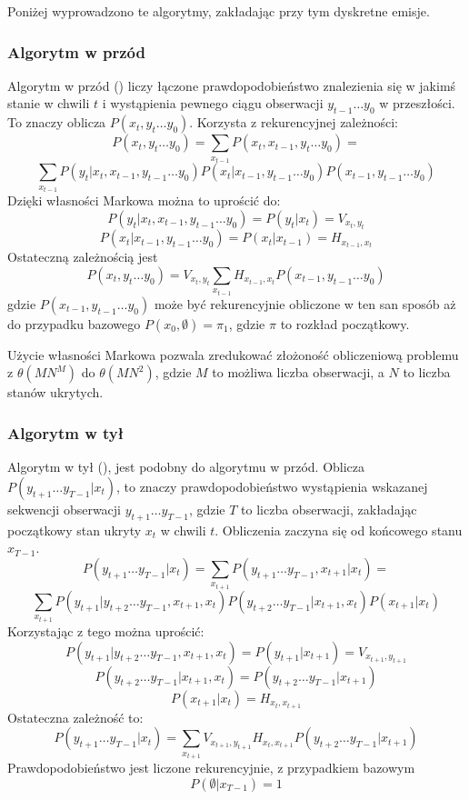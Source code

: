 Poniżej wyprowadzono te algorytmy, zakładając przy tym dyskretne emisje.

\subsubsection{Algorytm w przód}

Algorytm w przód () liczy łączone prawdopodobieństwo znalezienia się w jakimś stanie w chwili $t$
i wystąpienia pewnego ciągu obserwacji $y_{t-1} \dots y_0$ w przeszłości. To znaczy oblicza $P(x_t, y_t \dots y_0)$. Korzysta z rekurencyjnej zależności:
$$P(x_t, y_t \dots y_0) = \sum_{x_{t-1}} P(x_t, x_{t-1}, y_t \dots y_0) =$$
$$\sum_{x_{t-1}} P(y_t | x_t, x_{t-1}, y_{t-1} \dots y_0) P(x_t | x_{t-1}, y_{t-1} \dots y_0) P(x_{t-1}, y_{t-1} \dots y_0)$$
Dzięki własności Markowa można to uprościć do:
$$P(y_t | x_t, x_{t-1}, y_{t-1} \dots y_0) = P(y_t | x_t) = V_{x_t, y_t}$$
$$P(x_t | x_{t-1}, y_{t-1} \dots y_0) = P(x_t | x_{t-1}) = H_{x_{t-1}, x_t}$$
Ostateczną zależnością jest
$$P(x_t, y_t \dots y_0) = V_{x_t, y_t} \sum_{x_{t-1}} H_{x_{t-1}, x_t} P(x_{t-1}, y_{t-1} \dots y_0)$$
gdzie $P(x_{t-1}, y_{t-1} \dots y_0)$ może być rekurencyjnie obliczone w ten san sposób aż do przypadku bazowego $P(x_0, \emptyset) = \pi_1$, gdzie $\pi$ to rozkład początkowy.

Użycie własności Markowa pozwala zredukować złożoność obliczeniową problemu z $\theta(MN^M)$ do $\theta(MN^2)$, gdzie $M$ to możliwa liczba obserwacji, a $N$ to liczba stanów ukrytych.

\subsubsection{Algorytm w tył}

Algorytm w tył (), jest podobny do algorytmu w przód. Oblicza $P(y_{t+1} \dots y_{T-1} | x_t)$, to znaczy prawdopodobieństwo wystąpienia wskazanej sekwencji obserwacji $y_{t+1} \dots y_{T-1}$, gdzie $T$ to liczba obserwacji, zakładając początkowy stan ukryty $x_t$ w chwili $t$. Obliczenia zaczyna się od końcowego stanu $x_{T-1}$.
$$P(y_{t+1} \dots y_{T-1} | x_t) = \sum_{x_{t+1}} P(y_{t+1} \dots y_{T-1}, x_{t+1} | x_t) =$$
$$\sum_{x_{t+1}} P(y_{t+1} | y_{t+2} \dots y_{T-1}, x_{t+1}, x_t) P(y_{t+2} \dots y_{T-1} | x_{t+1}, x_t) P(x_{t+1} | x_t)$$
Korzystając z tego można uprościć:
$$P(y_{t+1} | y_{t+2} \dots y_{T-1}, x_{t+1}, x_t) = P(y_{t+1} | x_{t+1}) = V_{x_{t+1},y_{t+1}}$$
$$P(y_{t+2} \dots y_{T-1} | x_{t+1}, x_t) = P(y_{t+2} \dots y_{T-1} | x_{t+1})$$
$$P(x_{t+1} | x_t) = H_{x_t,x_{t+1}}$$
Ostateczna zależność to:
$$P(y_{t+1} \dots y_{T-1} | x_t) =  \sum_{x_{t+1}} V_{x_{t+1},y_{t+1}} H_{x_t,x_{t+1}} P(y_{t+2} \dots y_{T-1} | x_{t+1})$$
Prawdopodobieństwo jest liczone rekurencyjnie, z przypadkiem bazowym
$$P(\emptyset | x_{T-1}) = 1$$

